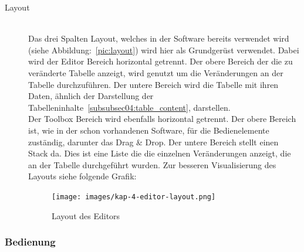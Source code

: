 \begin{description}
\item[Layout] \hfill\\
Das drei Spalten Layout, welches in der Software bereits verwendet wird (siehe Abbildung:~\ref{pic:layout}) wird hier als Grundgerüst verwendet. Dabei wird der Editor Bereich horizontal getrennt. Der obere Bereich der die zu veränderte Tabelle anzeigt, wird genutzt um die Veränderungen an der Tabelle durchzuführen. Der untere Bereich wird die Tabelle mit ihren Daten, ähnlich der Darstellung der Tabelleninhalte~\ref{subsubsec04:table_content}, darstellen. \\
Der Toolbox Bereich wird ebenfalls horizontal getrennt. Der obere Bereich ist, wie in der schon vorhandenen Software, für die Bedienelemente zuständig, darunter das Drag \& Drop. Der untere Bereich stellt einen Stack da. Dies ist eine Liste die die einzelnen Veränderungen anzeigt, die an der Tabelle durchgeführt wurden.
Zur besseren Visualisierung des Layouts siehe folgende Grafik:

\begin{figure}[ht]
    \texttt{[image: images/kap-4-editor-layout.png]}
    \centering
    \caption{Layout des Editors}
    \label{pic:layout_editor}
\end{figure}
\end{description}

\subsubsection{Bedienung}
\label{subsubsec04:editor_bedienung}

